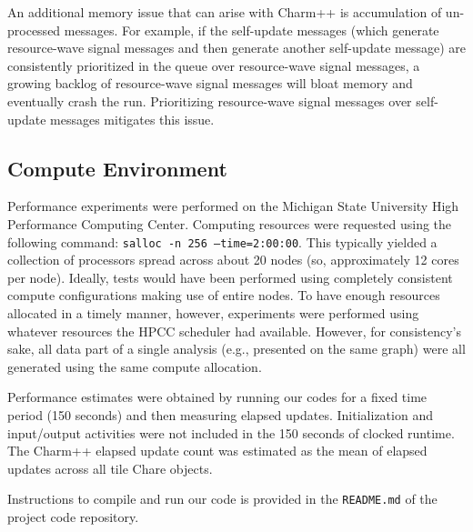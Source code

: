 An additional memory issue that can arise with Charm++ is accumulation of un-processed messages.
For example, if the self-update messages (which generate resource-wave signal messages and then generate another self-update message) are consistently prioritized in the queue over resource-wave signal messages, a growing backlog of resource-wave signal messages will bloat memory and eventually crash the run.
Prioritizing resource-wave signal messages over self-update messages mitigates this issue.

\subsection{Compute Environment} \label{sec:compute}

Performance experiments were performed on the Michigan State University High Performance Computing Center.
Computing resources were requested using the following command: \texttt{salloc -n 256 --time=2:00:00}.
This typically yielded a collection of processors spread across about 20 nodes (so, approximately 12 cores per node).
Ideally, tests would have been performed using completely consistent compute configurations making use of entire nodes.
To have enough resources allocated in a timely manner, however, experiments were performed using whatever resources the HPCC scheduler had available.
However, for consistency's sake, all data part of a single analysis (e.g., presented on the same graph) were all generated using the same compute allocation.

Performance estimates were obtained by running our codes for a fixed time period (150 seconds) and then measuring elapsed updates.
Initialization and input/output activities were not included in the 150 seconds of clocked runtime.
The Charm++ elapsed update count was estimated as the mean of elapsed updates across all tile Chare objects.

Instructions to compile and run our code is provided in the \texttt{README.md} of the project code repository.

